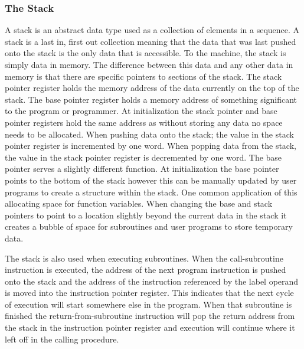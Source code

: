 \documentclass[man,hidelinks,floatsintext]{apa7}
\begin{document}
\subsubsection{The Stack}
\label{sec:stack}
A stack is an abstract data type used as a collection of elements in a sequence. A stack is a last in, first out collection meaning that the data that was last pushed onto the stack is the only data that is accessible. To the machine, the stack is simply data in memory. The difference between this data and any other data in memory is that there are specific pointers to sections of the stack. The stack pointer register holds the memory address of the data currently on the top of the stack. The base pointer register holds a memory address of something significant to the program or programmer. At initialization the stack pointer and base pointer registers hold the same address as without storing any data no space needs to be allocated. When pushing data onto the stack; the value in the stack pointer register is incremented by one word. When popping data from the stack, the value in the stack pointer register is decremented by one word. The base pointer serves a slightly different function. At initialization the base pointer points to the bottom of the stack however this can be manually updated by user programs to create a structure within the stack. One common application of this allocating space for function variables. When changing the base and stack pointers to point to a location slightly beyond the current data in the stack it creates a bubble of space for subroutines and user programs to store temporary data.\par
The stack is also used when executing subroutines. When the call-subroutine instruction is executed, the address of the next program instruction is pushed onto the stack and the address of the instruction referenced by the label operand is moved into the instruction pointer register. This indicates that the next cycle of execution will start somewhere else in the program. When that subroutine is finished the return-from-subroutine instruction will pop the return address from the stack in the instruction pointer register and execution will continue where it left off in the calling procedure.
\end{document}
